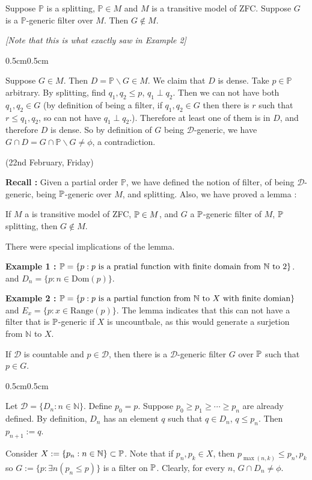 \documentclass[12pt,a4paper]{article}
\newenvironment{proof}
{\begin{changemargin}{0.5cm}{0.5cm} 
	}%
	{\end{changemargin}
}
\newenvironment{p}
{\begin{proof} 
	}%
	{\end{proof}
}
\begin{document}
\lem Suppose $\mathbb{P}$ is a splitting, $\mathbb{P} \in M$ and $M$ is a transitive model of ZFC. Suppose $G$ is a $\mathbb{P}$-generic filter over $M$. Then $G\not\in M$.

\emph{[Note that this is what exactly saw in Example 2]}
\begin{p}
\pf Suppose $G\in M$. Then $D= \mathbb{P} \backslash G \in M$. We claim that $D$ is dense. Take $p\in\mathbb{P}$ arbitrary. By splitting, find $q_1, q_2\leq p$, $q_1 \perp q_2$. Then we can not have both $q_1, q_2 \in G$ (by definition of being a filter, if $q_1, q_2\in G$ then there is $r$ such that $r\leq q_1, q_2$, so can not have $q_1 \perp q_2$.). Therefore at least one of them  is in $D$, and therefore $D$ is dense. So by definition of $G$ being $\mathscr{D}$-generic, we have $G\cap D = G\cap \mathbb{P}\backslash G \neq \phi$, a contradiction.

\eop
\end{p}
\s

\newday

(22nd February, Friday)
\s

\textbf{Recall :} Given a partial order $\mathbb{P}$, we have defined the notion of filter, of being $\mathscr{D}$-generic, being $\mathbb{P}$-generic over $M$, and splitting. Also, we have proved a lemma :
\s

\lem If $M$ a is transitive model of ZFC, $\mathbb{P} \in M$, and $G$ a $\mathbb{P}$-generic filter of $M$, $\mathbb{P}$ splitting, then $G\not \in M$.
\s

There were special implications of the lemma.
\s

\textbf{Example 1 :} $\mathbb{P}  =  \{p : p \text{ is a pratial function with finite domain from }\mathbb{N}\text{ to }2\}$. and $D_n = \{p : n\in \text{Dom}(p) \}$.

\textbf{Example 2 :} $\mathbb{P} = \{ p: p \text{ is a partial function from } \mathbb{N} \text{ to }X \text{ with finite domian}\}$ and $E_x = \{p : x\in \text{Range}(p)\}$. The lemma indicates that this can not have a filter that is $\mathbb{P}$-generic if $X$ is uncountbale, as this would generate a surjetion from $\mathbb{N}$ to $X$.
\s

\lem If $\mathscr{D}$ is countable and $p\in \mathscr{D}$, then there is a $\mathscr{D}$-generic filter $G$ over $\mathbb{P}$ such that $p\in G$.
\begin{p}
\pf Let $\mathscr{D} = \{D_n : n\in \mathbb{N}\}$. Define $p_0 =p$. Suppose $p_0 \geq p_1 \geq \cdots \geq p_n$ are already defined. By definition, $D_n$ has an element $q$ such that $q\in D_n$, $q\leq p_n$. Then $p_{n+1} := q$.

\quad Consider $X:= \{p_n : n\in \mathbb{N}\} \subset \mathbb{P}$. Note that if $p_n, p_k \in X$, then $p_{\max (n, k)} \leq p_n, p_k$ so $G:= \{p : \exists n (p_n \leq p) \}$ is a filter on $\mathbb{P}$. Clearly, for every $n$, $G\cap D_n \neq \phi$.

\eop
\end{p}
\s
\end{document}
